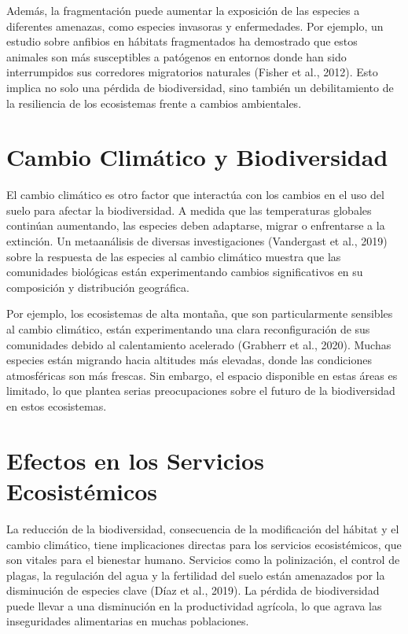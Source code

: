 \documentclass[
  letterpaper,
  DIV=11,
  numbers=noendperiod,
  oneside]{scrreprt}
\begin{document}
Además, la fragmentación puede aumentar la exposición de las especies a
diferentes amenazas, como especies invasoras y enfermedades. Por
ejemplo, un estudio sobre anfibios en hábitats fragmentados ha
demostrado que estos animales son más susceptibles a patógenos en
entornos donde han sido interrumpidos sus corredores migratorios
naturales (Fisher et al., 2012). Esto implica no solo una pérdida de
biodiversidad, sino también un debilitamiento de la resiliencia de los
ecosistemas frente a cambios ambientales.

\section{Cambio Climático y
Biodiversidad}\label{cambio-climuxe1tico-y-biodiversidad}

El cambio climático es otro factor que interactúa con los cambios en el
uso del suelo para afectar la biodiversidad. A medida que las
temperaturas globales continúan aumentando, las especies deben
adaptarse, migrar o enfrentarse a la extinción. Un metaanálisis de
diversas investigaciones (Vandergast et al., 2019) sobre la respuesta de
las especies al cambio climático muestra que las comunidades biológicas
están experimentando cambios significativos en su composición y
distribución geográfica.

Por ejemplo, los ecosistemas de alta montaña, que son particularmente
sensibles al cambio climático, están experimentando una clara
reconfiguración de sus comunidades debido al calentamiento acelerado
(Grabherr et al., 2020). Muchas especies están migrando hacia altitudes
más elevadas, donde las condiciones atmosféricas son más frescas. Sin
embargo, el espacio disponible en estas áreas es limitado, lo que
plantea serias preocupaciones sobre el futuro de la biodiversidad en
estos ecosistemas.

\section{Efectos en los Servicios
Ecosistémicos}\label{efectos-en-los-servicios-ecosistuxe9micos}

La reducción de la biodiversidad, consecuencia de la modificación del
hábitat y el cambio climático, tiene implicaciones directas para los
servicios ecosistémicos, que son vitales para el bienestar humano.
Servicios como la polinización, el control de plagas, la regulación del
agua y la fertilidad del suelo están amenazados por la disminución de
especies clave (Díaz et al., 2019). La pérdida de biodiversidad puede
llevar a una disminución en la productividad agrícola, lo que agrava las
inseguridades alimentarias en muchas poblaciones.
\end{document}
